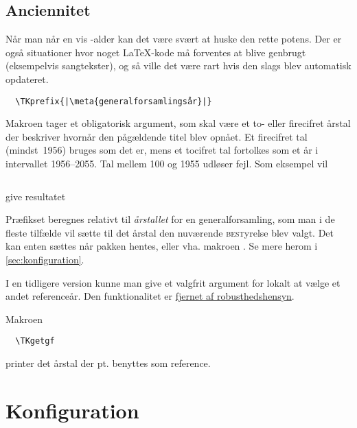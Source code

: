 \documentclass[a4paper,article,oneside,danish]{memoir}
\newenvironment{resultat}{%
  \begin{adjustwidth}{15mm}{15mm}%
    \begin{qshade}%
    }{%
    \end{qshade}%
  \end{adjustwidth}}
\begin{document}

\section{Anciennitet}
\label{sec:anciennitet}

Når man når en vis \TK-alder kan det være svært at huske den rette
potens. Der er også situationer hvor noget \LaTeX-kode må forventes at
blive genbrugt (eksempelvis sangtekster), og så ville det være rart
hvis den slags blev automatisk opdateret.

\begin{verbatim}
  \TKprefix{|\meta{generalforsamlingsår}|}
\end{verbatim}

Makroen  tager et obligatorisk argument, som skal være et
to- eller firecifret årstal der beskriver hvornår den pågældende titel
blev opnået. Et firecifret tal (mindst~1956) bruges som det er, mens
et tocifret tal fortolkes som et år i intervallet 1956--2055. Tal
mellem 100 og 1955 udløser fejl. Som eksempel vil

\inputminted{latex}{eksempel-prefix1.tex}
give resultatet

\begin{resultat}

\end{resultat}

Præfikset beregnes relativt til \emph{årstallet} for en
generalforsamling, som man i de fleste tilfælde vil sætte til det
årstal den nuværende \textsc{best}yrelse blev valgt. Det kan enten
sættes når pakken hentes, eller vha. makroen . Se mere
herom i \vref{sec:konfiguration}.

I en tidligere version kunne man give  et valgfrit
argument for lokalt at vælge et andet referenceår. Den funktionalitet
er \hyperref[sec:-og-]{fjernet af robusthedshensyn}.

Makroen
\begin{verbatim}
  \TKgetgf
\end{verbatim}
printer det årstal der pt. benyttes som reference.


\chapter{Konfiguration}
\label{sec:konfiguration}
\end{document}
